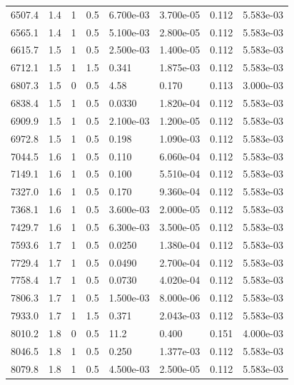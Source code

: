 \documentclass[preview]{standalone}
\begin{document}
{{{\begin{tabular}{L{1.2cm}C{1.2cm} C{0.3cm}C{0.5cm} C{1.4cm}C{1.4cm} C{1.4cm}C{1.4cm}}
  6507.4  &   1.4  & 1     & 0.5 &  6.700e-03  & 3.700e-05  & 0.112 &  5.583e-03   \\ 
  6565.1  &   1.4  & 1     & 0.5 &  5.100e-03  & 2.800e-05  & 0.112 &  5.583e-03   \\ 
  6615.7  &   1.5  & 1     & 0.5 &  2.500e-03  & 1.400e-05  & 0.112 &  5.583e-03   \\ 
  6712.1  &   1.5  & 1     & 1.5 &  0.341  & 1.875e-03  & 0.112 &  5.583e-03   \\ 
  6807.3  &   1.5  & 0     & 0.5 &  4.58  & 0.170  & 0.113 &  3.000e-03   \\ 
  6838.4  &   1.5  & 1     & 0.5 &  0.0330  & 1.820e-04  & 0.112 &  5.583e-03   \\ 
  6909.9  &   1.5  & 1     & 0.5 &  2.100e-03  & 1.200e-05  & 0.112 &  5.583e-03   \\ 
  6972.8  &   1.5  & 1     & 0.5 &  0.198  & 1.090e-03  & 0.112 &  5.583e-03   \\ 
  7044.5  &   1.6  & 1     & 0.5 &  0.110  & 6.060e-04  & 0.112 &  5.583e-03   \\ 
  7149.1  &   1.6  & 1     & 0.5 &  0.100  & 5.510e-04  & 0.112 &  5.583e-03   \\ 
  7327.0  &   1.6  & 1     & 0.5 &  0.170  & 9.360e-04  & 0.112 &  5.583e-03   \\ 
  7368.1  &   1.6  & 1     & 0.5 &  3.600e-03  & 2.000e-05  & 0.112 &  5.583e-03   \\ 
  7429.7  &   1.6  & 1     & 0.5 &  6.300e-03  & 3.500e-05  & 0.112 &  5.583e-03   \\ 
  7593.6  &   1.7  & 1     & 0.5 &  0.0250  & 1.380e-04  & 0.112 &  5.583e-03   \\ 
  7729.4  &   1.7  & 1     & 0.5 &  0.0490  & 2.700e-04  & 0.112 &  5.583e-03   \\ 
  7758.4  &   1.7  & 1     & 0.5 &  0.0730  & 4.020e-04  & 0.112 &  5.583e-03   \\ 
  7806.3  &   1.7  & 1     & 0.5 &  1.500e-03  & 8.000e-06  & 0.112 &  5.583e-03   \\ 
  7933.0  &   1.7  & 1     & 1.5 &  0.371  & 2.043e-03  & 0.112 &  5.583e-03   \\ 
  8010.2  &   1.8  & 0     & 0.5 &  11.2  & 0.400  & 0.151 &  4.000e-03   \\ 
  8046.5  &   1.8  & 1     & 0.5 &  0.250  & 1.377e-03  & 0.112 &  5.583e-03   \\ 
  8079.8  &   1.8  & 1     & 0.5 &  4.500e-03  & 2.500e-05  & 0.112 &  5.583e-03   \\ 

\end{tabular}}}}
\end{document}
